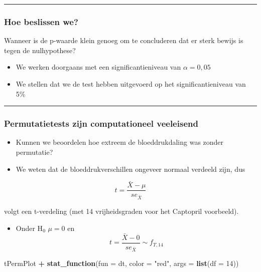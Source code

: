 \documentclass[
  12pt,dutch,coursenotes]{book}
\newenvironment{Shaded}{\begin{snugshade}}{\end{snugshade}}
\newcommand{\DataTypeTok}[1]{\textcolor[rgb]{0.13,0.29,0.53}{#1}}
\newcommand{\DecValTok}[1]{\textcolor[rgb]{0.00,0.00,0.81}{#1}}
\newcommand{\KeywordTok}[1]{\textcolor[rgb]{0.13,0.29,0.53}{\textbf{#1}}}
\newcommand{\NormalTok}[1]{#1}
\newcommand{\OperatorTok}[1]{\textcolor[rgb]{0.81,0.36,0.00}{\textbf{#1}}}
\newcommand{\StringTok}[1]{\textcolor[rgb]{0.31,0.60,0.02}{#1}}
\providecommand{\tightlist}{%
  \setlength{\itemsep}{0pt}\setlength{\parskip}{0pt}}
\theoremstyle{definition}
\theoremstyle{definition}
\theoremstyle{definition}
\theoremstyle{remark}
\begin{document}
\begin{center}\rule{0.5\linewidth}{0.5pt}\end{center}

\hypertarget{hoe-beslissen-we}{%
\subsubsection{Hoe beslissen we?}\label{hoe-beslissen-we}}

Wanneer is de p-waarde klein genoeg om te concluderen dat er sterk bewijs is tegen de nulhypothese?

\begin{itemize}
\item
  We werken doorgaans met een significantieniveau van \(\alpha = 0,05\)
\item
  We stellen dat we de test hebben uitgevoerd op het significantieniveau van 5\%
\end{itemize}

\begin{center}\rule{0.5\linewidth}{0.5pt}\end{center}

\hypertarget{permutatietests-zijn-computationeel-veeleisend}{%
\subsubsection{Permutatietests zijn computationeel veeleisend}\label{permutatietests-zijn-computationeel-veeleisend}}

\begin{itemize}
\item
  Kunnen we beoordelen hoe extreem de bloeddrukdaling was zonder permutatie?
\item
  We weten dat de bloeddrukverschillen ongeveer normaal verdeeld zijn, dus
\end{itemize}

\[t=\frac{\bar X - \mu}{se_{\bar X}}\]

volgt een t-verdeling (met 14 vrijheidsgraden voor het Captopril voorbeeld).

\begin{itemize}
\tightlist
\item
  Onder H\(_0\) \(\mu=0\) en \[t=\frac{\bar X-0}{se_{\bar X}}\sim f_{T,14}\]
\end{itemize}

\begin{Shaded}
\begin{Highlighting}[]
\NormalTok{tPermPlot }\OperatorTok{+}\StringTok{ }\KeywordTok{stat\_function}\NormalTok{(}\DataTypeTok{fun =}\NormalTok{ dt, }\DataTypeTok{color =} \StringTok{"red"}\NormalTok{, }
    \DataTypeTok{args =} \KeywordTok{list}\NormalTok{(}\DataTypeTok{df =} \DecValTok{14}\NormalTok{))}
\end{Highlighting}
\end{Shaded}
\end{document}
